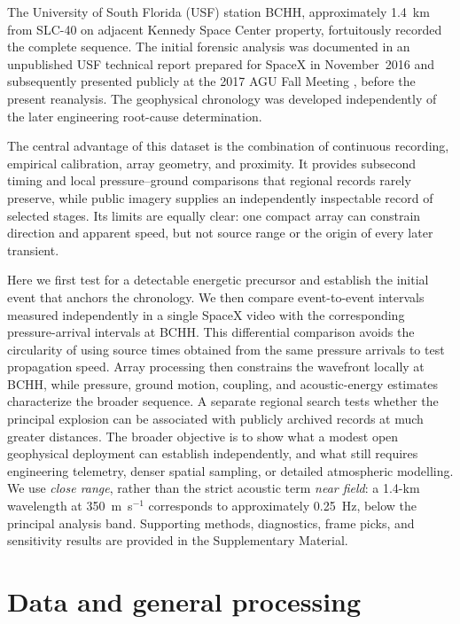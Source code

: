\documentclass[]{seismica}
\begin{document}
The University of South Florida (USF) station BCHH, approximately 1.4~km from
SLC-40 on adjacent Kennedy Space Center property, fortuitously recorded the
complete sequence. The initial forensic analysis was documented in an
unpublished USF technical report prepared for SpaceX in November~2016
\citep{thompson_mcnutt_fireball_2016} and subsequently presented publicly at
the 2017 AGU Fall Meeting \citep{thompson_agu_falcon9_2017}, before the
present reanalysis. The geophysical chronology was developed independently of
the later engineering root-cause determination.

The central advantage of this dataset is the combination of continuous
recording, empirical calibration, array geometry, and proximity. It provides
subsecond timing and local pressure--ground comparisons that regional records
rarely preserve, while public imagery supplies an independently inspectable
record of selected stages. Its limits are equally clear: one compact array can
constrain direction and apparent speed, but not source range or the origin of
every later transient.

Here we first test for a detectable energetic precursor and establish the
initial event that anchors the chronology. We then compare event-to-event
intervals measured independently in a single SpaceX video with the corresponding
pressure-arrival intervals at BCHH. This differential comparison avoids the
circularity of using source times obtained from the same pressure arrivals to
test propagation speed. Array processing then constrains the wavefront locally
at BCHH, while pressure, ground motion, coupling, and acoustic-energy estimates
characterize the broader sequence. A separate regional search tests whether the
principal explosion can be associated with publicly archived records at much
greater distances. The broader objective is to show what a modest open
geophysical deployment can establish independently, and what still requires
engineering telemetry, denser spatial sampling, or detailed atmospheric
modelling. We use \emph{close range}, rather than the strict acoustic term
\emph{near field}: a 1.4-km wavelength at 350~m~s$^{-1}$ corresponds to
approximately 0.25~Hz, below the principal analysis band. Supporting methods,
diagnostics, frame picks, and sensitivity results are provided in the
Supplementary Material.


\section{Data and general processing}
\label{sec:data}
\end{document}
